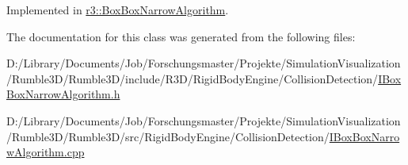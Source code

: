 Implemented in \mbox{\hyperlink{classr3_1_1_box_box_narrow_algorithm_affa36eb5b3ce937a018bc02f6f5e203c}{r3\+::\+Box\+Box\+Narrow\+Algorithm}}.



The documentation for this class was generated from the following files\+:\begin{DoxyCompactItemize}
\item 
D\+:/\+Library/\+Documents/\+Job/\+Forschungsmaster/\+Projekte/\+Simulation\+Visualization/\+Rumble3\+D/\+Rumble3\+D/include/\+R3\+D/\+Rigid\+Body\+Engine/\+Collision\+Detection/\mbox{\hyperlink{_i_box_box_narrow_algorithm_8h}{I\+Box\+Box\+Narrow\+Algorithm.\+h}}\item 
D\+:/\+Library/\+Documents/\+Job/\+Forschungsmaster/\+Projekte/\+Simulation\+Visualization/\+Rumble3\+D/\+Rumble3\+D/src/\+Rigid\+Body\+Engine/\+Collision\+Detection/\mbox{\hyperlink{_i_box_box_narrow_algorithm_8cpp}{I\+Box\+Box\+Narrow\+Algorithm.\+cpp}}\end{DoxyCompactItemize}
